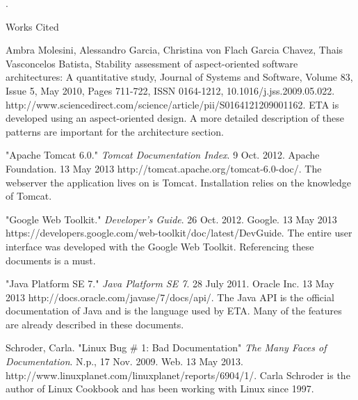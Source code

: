 \documentclass[a4paper,12pt]{texMemo}
\newcommand{\bibent}{\noindent \hangindent 40pt}
\newenvironment{workscited}{\newpage \begin{center} Works Cited \end{center}}{\newpage }
\begin{document}
 \newpage. \begin{workscited}
  \bibent
 Ambra Molesini, Alessandro Garcia, Christina von Flach Garcia Chavez, Thais Vasconcelos Batista, Stability assessment of aspect-oriented software architectures: A quantitative study, Journal of Systems and Software, Volume 83, Issue 5, May 2010, Pages 711-722, ISSN 0164-1212, 10.1016/j.jss.2009.05.022.
\\http://www.sciencedirect.com/science/article/pii/S0164121209001162. ETA is developed using an aspect-oriented design. A more detailed description of these patterns are important for the architecture section.

 \bibent
 "Apache Tomcat 6.0." \textit{Tomcat Documentation Index}. 9 Oct. 2012. Apache Foundation.  13 May 2013 http://tomcat.apache.org/tomcat-6.0-doc/. The webserver the application lives on is Tomcat. Installation relies on the knowledge of Tomcat.
 
 \bibent
 "Google Web Toolkit." \textit{Developer's Guide}. 26 Oct. 2012. Google. 13 May 2013 \\https://developers.google.com/web-toolkit/doc/latest/DevGuide. The entire user interface was developed with the Google Web Toolkit. Referencing these documents is a must.
 
 \bibent
 "Java Platform SE 7." \textit{Java Platform SE 7}. 28 July 2011. Oracle Inc. 13 May 2013 http://docs.oracle.com/javase/7/docs/api/. The Java API is the official documentation of Java and is the language used by ETA. Many of the features are already described in these documents.
 

 \bibent
  Schroder, Carla. "Linux Bug \# 1: Bad Documentation" \textit{The Many Faces of Documentation}. N.p., 17 Nov. 2009. Web. 13 May 2013.\\ http://www.linuxplanet.com/linuxplanet/reports/6904/1/. Carla Schroder is the author of Linux Cookbook and has been working with Linux since 1997.

 
 \end{workscited}


 
\end{document}
